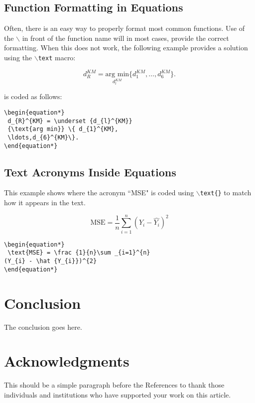 \documentclass[lettersize,journal]{IEEEtran}
\begin{document}
    \subsection{Function Formatting in Equations}
    Often, there is an easy way to properly format most common functions. Use of the $\backslash$ in front of the function name will in most cases, provide the correct formatting. When this does not work, the following example provides a solution using the $\backslash${\tt{text}} macro:

    \begin{equation*}
        d_{R}^{KM} = \underset {d_{l}^{KM}} {\text{arg min}} \{ d_{1}^{KM},\ldots,d_{6}^{KM}\}.
    \end{equation*}

    \noindent is coded as follows:
    \begin{verbatim}
\begin{equation*}
 d_{R}^{KM} = \underset {d_{l}^{KM}}
 {\text{arg min}} \{ d_{1}^{KM},
 \ldots,d_{6}^{KM}\}.
\end{equation*}
    \end{verbatim}

    \subsection{ Text Acronyms Inside Equations}
    This example shows where the acronym ``MSE" is coded using $\backslash${\tt{text\{\}}} to match how it appears in the text.

    \begin{equation*}
        \text{MSE} = \frac {1}{n}\sum _{i=1}^{n}(Y_{i} - \hat {Y_{i}})^{2}
    \end{equation*}

    \begin{verbatim}
\begin{equation*}
 \text{MSE} = \frac {1}{n}\sum _{i=1}^{n}
(Y_{i} - \hat {Y_{i}})^{2}
\end{equation*}
    \end{verbatim}

    \section{Conclusion}
    The conclusion goes here.


    \section*{Acknowledgments}
    This should be a simple paragraph before the References to thank those individuals and institutions who have supported your work on this article.
\end{document}
